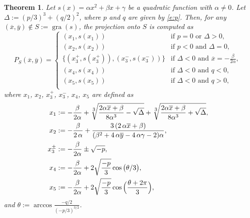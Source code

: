 \documentclass[11pt]{article}
\newtheorem{theorem}{Theorem}[section]
\providecommand{\gra}{\operatorname{gra}}
\newcommand{\px}{\overline{x}}
\newcommand{\py}{\overline{y}}
\begin{document}
\begin{theorem}\label{t:main}
    Let $s(x)=\alpha x^2+\beta x+\gamma$ be a quadratic function with $\alpha\neq 0$. Let $\Delta := (p/3)^3+(q/2)^2$, where $p$ and $q$ are given by \cref{e:p}. Then, for any $(\px,\py)\notin S:=\gra(s)$, the projection onto $S$ is computed as
    \[P_S(\px,\py)=\begin{cases}
        (x_1,s(x_1)) & \text{if }p=0\text{ or }\Delta>0,\\
        (x_2,s(x_2)) & \text{if }p<0\text{ and }\Delta=0,\\
        \{(x^+_3,s(x^+_3)),(x^-_3,s(x^-_3))\} &\text{if }\Delta<0\text{ and }\px=-\frac{\beta}{2\alpha},\\
        (x_4,s(x_4)) &\text{if }\Delta<0\text{ and }q<0,\\
        (x_5,s(x_5)) &\text{if }\Delta<0\text{ and }q>0,\\
    \end{cases}\]
    where $x_1$, $x_2$, $x_3^+$, $x_3^-$, $x_4$, $x_5$ are defined as
    \begin{align*}
        x_1&:=-\frac{\beta}{2\alpha}+\sqrt[\mathlarger 3]{\frac{2\alpha\px+\beta}{8\alpha^3}-\sqrt{\Delta}}+\sqrt[\mathlarger 3]{\frac{2\alpha\px+\beta}{8\alpha^3}+ \sqrt{\Delta}},\\
        x_2&:=
-\frac{\beta}{2 \, \alpha} + 
\frac{3 \, {\left(2 \, \alpha \px + \beta\right)}}{{\left(\beta^{2} + 4 \, \alpha \py - 4 \, \alpha \gamma - 2\right)} \alpha},\\
x_3^\pm&:=-\frac{\beta}{2\alpha}\pm\sqrt{-p},\\
x_4&:=-\frac{\beta}{2\alpha}+2\sqrt{\frac{-p}{3}}\cos\big(\theta/3\big),\\
     x_5&:=-\frac{\beta}{2\alpha}+2\sqrt{\frac{-p}{3}}\cos\Big(\frac{\theta+2\pi}3\Big),
    \end{align*}
and $\theta := \arccos \frac{-q/2}{(-p/3)^{3/2}}$.
\end{theorem}
\end{document}
